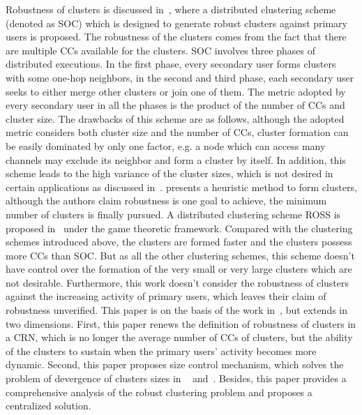 \documentclass[10pt,journal,compsoc]{IEEEtran}
\theoremstyle{mytheoremstyle}
\theoremstyle{mytheoremstyle}
\theoremstyle{mytheoremstyle}
\newcommand{\ie}{i.e., }
\begin{document}
Robustness of clusters is discussed in~\cite{LIU_TMC11_2}, where a distributed clustering scheme (denoted as SOC) which is designed to generate robust clusters against primary users is proposed.
The robustness of the clusters comes from the fact that there are multiple CCs available for the clusters.
SOC involves three phases of distributed executions.
In the first phase, every secondary user forms clusters with some one-hop neighbors, in the second and third phase, each secondary user seeks to either merge other clusters or join one of them.
The metric adopted by every secondary user in all the phases is the product of the number of CCs and cluster size.
The drawbacks of this scheme are as follows, although the adopted metric considers both cluster size and the number of CCs, cluster formation can be easily dominated by only one factor, e.g. a node which can access many channels may exclude its neighbor and form a cluster by itself.
In addition, this scheme leads to the high variance of the cluster sizes, which is not desired in certain applications as discussed in~\cite{clustering_globecom11, cluster_EW10}.
\cite{mansoor_15_cluster_robust} presents a heuristic method to form clusters, although the authors claim robustness is one goal to achieve, the minimum number of clusters is finally pursued.
%
A distributed clustering scheme ROSS is proposed in~\cite{Li11_ROSS} under the game theoretic framework. 
Compared with the clustering schemes introduced above, the clusters are formed faster and the clusters possess more CCs than SOC.
But as all the other clustering schemes, this scheme doesn't have control over the formation of the very small or very large clusters which are not desirable.
Furthermore, this work doesn't consider the robustness of clusters against the increasing activity of primary users, which leaves their claim of robustness unverified.
%
This paper is on the basis of the work in~\cite{Li11_ROSS}, but extends in two dimensions.
First, this paper renews the definition of robustness of clusters in a CRN, which is no longer the average number of CCs of clusters, but the ability of the clusters to sustain when the primary users' activity becomes more dynamic.
Second, this paper proposes size control mechanism, which solves the problem of devergence of clusters sizes in ~\cite{Li11_ROSS} and~\cite{LIU_TMC11_2}.
Besides, this paper provides a comprehensive analysis of the robust clustering problem and proposes a centralized solution. 
\end{document}
